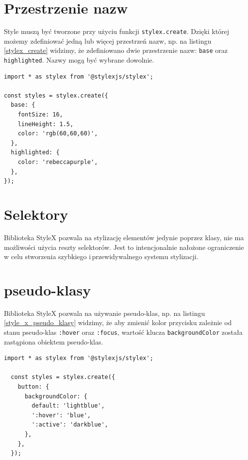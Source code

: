 \documentclass[a4paper,12pt]{book} %
\begin{document}
\section{Przestrzenie nazw}
Style muszą być tworzone przy użyciu funkcji \lstinline|stylex.create|. Dzięki której możemy zdefiniować jedną lub więcej przestrzeń nazw, np. na listingu \ref{stylex_create} widzimy, że zdefiniowano dwie przestrzenie nazw: \lstinline|base| oraz \lstinline|highlighted|. Nazwy mogą być wybrane dowolnie.

\begin{lstfloat}[hb]
  \lstset{language=HTML}
  \begin{lstlisting}[frame=single]
import * as stylex from '@stylexjs/stylex';

const styles = stylex.create({
  base: {
    fontSize: 16,
    lineHeight: 1.5,
    color: 'rgb(60,60,60)',
  },
  highlighted: {
    color: 'rebeccapurple',
  },
});
\end{lstlisting}
  \caption{Przykład tworzenia przestrzeni nazw}\label{stylex_create}
\end{lstfloat}

\section{Selektory}
Biblioteka StyleX pozwala na stylizację elementów jedynie poprzez klasy, nie ma możliwości użycia reszty selektorów. Jest to intencjonalnie nałożone ograniczenie w celu stworzenia szybkiego i\,przewidywalnego systemu stylizacji.
\section{pseudo-klasy}
Biblioteka StyleX pozwala na używanie pseudo-klas, np. na listingu \ref{style_x_pseudo_klasy} widzimy, że aby zmienić kolor przycisku zależnie od stanu pseudo-klas \lstinline|:hover| oraz \lstinline|:focus|, wartość klucza \lstinline|backgroundColor| została zastąpiona obiektem pseudo-klas.

\begin{lstfloat}[hb]
  \lstset{language=HTML}
  \begin{lstlisting}[frame=single]
  import * as stylex from '@stylexjs/stylex';

  const styles = stylex.create({
    button: {
      backgroundColor: {
        default: 'lightblue',
        ':hover': 'blue',
        ':active': 'darkblue',
      },
    },
  });
\end{lstlisting}
  \caption{Przykład wykorzystania pseudo-klasy}\label{style_x_pseudo_klasy}
\end{lstfloat}
\end{document}
